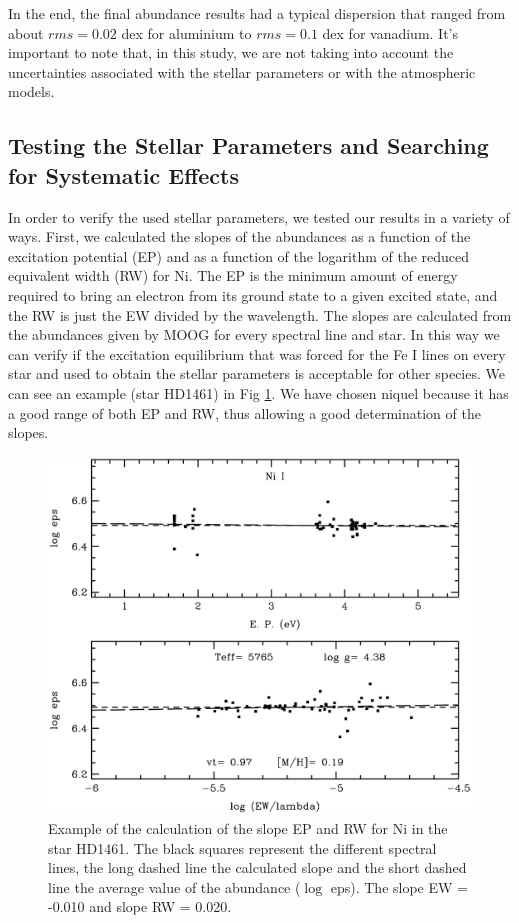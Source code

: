 \documentclass[dvips,12pt,a4paper]{report}
\begin{document}
{{In the end, the final abundance results had a typical dispersion that ranged from about $rms=0.02$ dex for aluminium to $rms=0.1$ dex for vanadium. It's important to note that, in this study, we are not taking into account the uncertainties associated with the stellar parameters or with the atmospheric models.


\subsection {Testing the Stellar Parameters and Searching \\for Systematic Effects}
\label{testpar}
In order to verify the used stellar parameters,  we tested our results in a variety of ways. First, we calculated the slopes of the abundances as a function of the excitation potential (EP) and as a function of the logarithm of the reduced equivalent width (RW) for Ni. The EP is the minimum amount of energy required to bring an electron from its ground state to a given excited state, and the RW is just the EW divided by the wavelength. The slopes are calculated from the abundances given by MOOG for every spectral line and star. In this way we can verify if the excitation equilibrium that was forced for the Fe I lines on every star and used to obtain the stellar parameters \citep{Santos-2000b} is acceptable for other species. We can see an example (star HD1461) in Fig \ref{exslope}. We have chosen niquel because it has a good range of both EP and RW, thus allowing a good determination of the slopes.

\begin{figure}[h]
\centering
\includegraphics[trim=0mm 0mm 0mm 10mm, clip,width= 10 cm]{pics/parte3/moogpicniq.eps}
\caption[Example of the calculation for Ni of the slope EP and RW]{Example of the calculation of the slope EP and RW for Ni in the star HD1461. The black squares represent the different spectral lines, the long dashed line the calculated slope and the short dashed line the average value of the abundance ($\log$ eps). The slope EW = -0.010 and slope RW = 0.020.}
\label{exslope}
\end{figure}

}}
\end{document}
